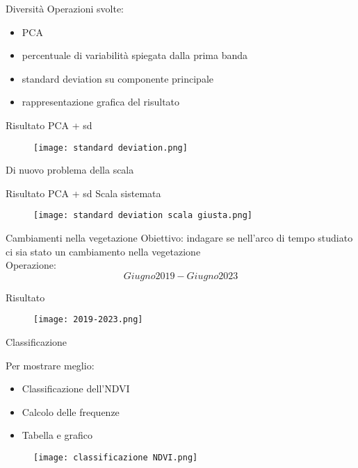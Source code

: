 \documentclass{beamer} %
\begin{document}
\begin{frame}{Diversità}
Operazioni svolte: 
	\begin{itemize}
 		\itme funzione \texttt{pairs()}
		\item PCA
  		\item percentuale di variabilità spiegata dalla prima banda
		\item standard deviation su componente principale 
		\item rappresentazione grafica del risultato
	\end{itemize}
\end{frame}


\begin{frame}{Risultato PCA + sd}
	\begin{figure}
		\centering
		\texttt{[image: standard deviation.png]}
		\label{fig:enter-label}
	\end{figure}
\centering 
Di nuovo problema della scala 
\end{frame}


\begin{frame}{Risultato PCA + sd}
Scala sistemata
	\begin{figure}
		\centering
		\texttt{[image: standard deviation scala giusta.png]}
  		\label{fig:enter-label}
	\end{figure}
\end{frame}


\begin{frame}{Cambiamenti nella vegetazione}
Obiettivo: indagare se nell'arco di tempo studiato ci sia stato un cambiamento nella vegetazione \\
Operazione: 
	\begin{equation}
		Giugno 2019 - Giugno 2023
  	\end{equation}
\end{frame}


\begin{frame}{Risultato}
	\begin{figure}
		\centering
		\texttt{[image: 2019-2023.png]}
  		\label{fig:enter-label}
	\end{figure} 
\end{frame}


\begin{frame}{Classificazione}
\begin{multicols}{2}
Per mostrare meglio: 
	\begin{itemize}
		\item Classificazione dell'NDVI
		\item Calcolo delle frequenze
		\item Tabella e grafico 
  	\end{itemize}
\columnbreak
	\begin{figure}
		\centering
		\texttt{[image: classificazione NDVI.png]}
  		\label{fig:enter-label}
	\end{figure}
\end{multicols}
\end{frame}
\end{document}
